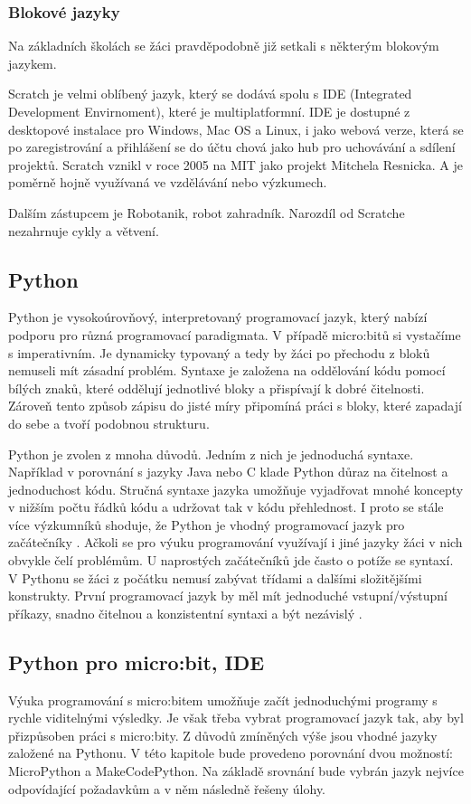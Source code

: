 \documentclass[
  digital,     %
  oneside,     %
  nosansbold,  %
  colorbold, %
  lof,         %
  nolot,         %
]{fithesis4}
\begin{document}
\subsubsection{Blokové jazyky}
Na základních školách se žáci pravděpodobně již setkali s některým blokovým jazykem.

Scratch je velmi oblíbený jazyk, který se dodává spolu s IDE (Integrated Development Envirnoment), které je multiplatformní. IDE je dostupné z desktopové instalace pro Windows, Mac OS a Linux, i jako webová verze, která se po zaregistrování a přihlášení se do účtu chová jako hub pro uchovávání a sdílení projektů. Scratch vznikl v roce 2005 na MIT jako projekt Mitchela Resnicka. A je poměrně hojně využívaná ve vzdělávání nebo výzkumech.

Dalším zástupcem je Robotanik, robot zahradník. Narozdíl od Scratche nezahrnuje cykly a větvení.

\subsection{Python}
Python je vysokoúrovňový, interpretovaný programovací jazyk, který nabízí podporu pro různá programovací paradigmata. V případě micro:bitů si vystačíme s imperativním. Je dynamicky typovaný a tedy by žáci po přechodu z bloků nemuseli mít zásadní problém. Syntaxe je založena na oddělování kódu pomocí bílých znaků, které oddělují jednotlivé bloky a přispívají k dobré čitelnosti. Zároveň tento způsob zápisu do jisté míry připomíná práci s bloky, které zapadají do sebe a tvoří podobnou strukturu.

Python je zvolen z mnoha důvodů. Jedním z nich je jednoduchá syntaxe. Například v porovnání s jazyky Java nebo C klade Python důraz na čitelnost a jednoduchost kódu. Stručná syntaxe jazyka umožňuje vyjadřovat mnohé koncepty v nižším počtu řádků kódu a udržovat tak v kódu přehlednost. I proto se stále více výzkumníků shoduje, že Python  je vhodný programovací jazyk pro začátečníky \cite{Wainer18, Narayanan19, Lo15}. Ačkoli se pro výuku programování využívají i jiné jazyky žáci v nich obvykle čelí problémům. U naprostých začátečníků jde často o potíže se syntaxí. V Pythonu se žáci z počátku nemusí zabývat třídami a dalšími složitějšími konstrukty. První programovací jazyk by měl mít jednoduché vstupní/výstupní příkazy, snadno čitelnou a konzistentní syntaxi a být nezávislý \cite{Lo15}.

\subsection{Python pro micro:bit, IDE}
Výuka programování s micro:bitem umožňuje začít jednoduchými programy s rychle viditelnými výsledky. Je však třeba vybrat programovací jazyk tak, aby byl přizpůsoben práci s micro:bity. Z důvodů zmíněných výše jsou vhodné jazyky založené na Pythonu. V této kapitole bude provedeno porovnání dvou možností: MicroPython a MakeCodePython. Na základě srovnání bude vybrán jazyk nejvíce odpovídající požadavkům a v něm následně řešeny úlohy.
\end{document}
